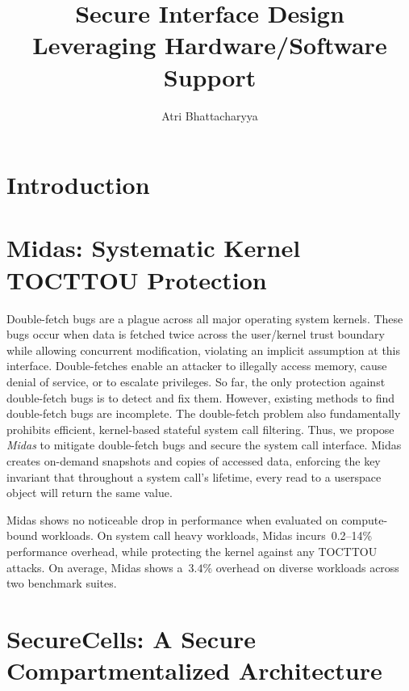 \documentclass[lablogo]{thesis}
\title{Secure Interface Design \\Leveraging Hardware/Software Support}
\author{Atri Bhattacharyya}
\newcommand{\tocttou}{TOCTTOU\xspace}
\newcommand{\midas}{Midas\xspace}
\begin{document}
\chapter{Introduction}




\chapter{Midas: Systematic Kernel \tocttou Protection}
\label{ch:midas}

Double-fetch bugs are a plague across all major operating system kernels. 
These bugs occur when data is fetched twice across the user/kernel trust 
boundary while allowing concurrent modification, violating an implicit
assumption at this interface.
Double-fetches enable an attacker to illegally access memory, cause 
denial of service, or to escalate privileges.
%
So far, the only protection against double-fetch bugs is to detect and fix them.
However, existing methods to find double-fetch bugs are incomplete.
%
The double-fetch problem also fundamentally prohibits efficient, kernel-based
stateful system call filtering.
Thus, we propose \emph{\midas} to mitigate double-fetch bugs and secure the
system call interface.
\midas creates on-demand
snapshots and copies of accessed data, enforcing the key invariant
that throughout a system call's lifetime, every read to a userspace object
will return the same value.

\midas shows no noticeable drop in performance when evaluated on compute-bound
workloads. 
On system call heavy workloads, \midas incurs~0.2--14\% performance overhead, 
while protecting the kernel against any \tocttou attacks. 
On average, \midas shows a~$3.4\%$ overhead on diverse workloads across two 
benchmark suites.

\newpage


\chapter{SecureCells: A Secure Compartmentalized Architecture}
\label{ch:seccells}
\end{document}

